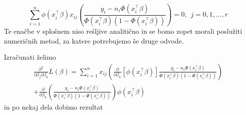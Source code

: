\documentclass[12pt,a4paper]{amsart}
\theoremstyle{definition} %
\theoremstyle{plain} %
\begin{document}
\begin{equation}
    \sum_{i = 1}^{n}\phi(x_{i}^\top\beta)x_{ij}\left(\frac{y_{i} - n_{i}\Phi(x_{i}^\top\beta)}{\Phi(x_{i}^\top\beta)(1-\Phi(x_{i}^\top\beta))}\right) = 0,~~j=0,1,\ldots,r
\end{equation}
Te enačbe v splošnem niso rešljive analitično in se bomo zopet morali poslužiti numeričnih metod, za katere potrebujemo še druge odvode.

Izračunati želimo
\begin{multline*}
    \frac{\partial^2}{\partial\beta_{j}\partial\beta_{k}}L(\beta) = \sum_{i = 1}^{n}x_{ij}\left(\frac{\partial}{\partial\beta_{k}}[\phi(x_{i}^\top\beta)]\frac{y_{i} - n_{i}\Phi(x_{i}^\top\beta)}{\Phi(x_{i}^\top\beta)(1-\Phi(x_{i}^\top\beta))}\right)\\
    +\frac{\partial}{\partial\beta_{k}}\left(\frac{y_{i} - n_{i}\Phi(x_{i}^\top\beta)}{\Phi(x_{i}^\top\beta)(1-\Phi(x_{i}^\top\beta))}\right)\phi(x_{i}^\top\beta)
\end{multline*}
in po nekaj dela dobimo rezultat 
\end{document}
